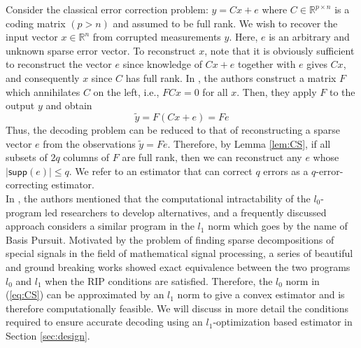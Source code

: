 \documentclass[../../thesis.tex]{subfiles}
\newcommand{\norm}[1]{\left\lVert#1\right\rVert}
\begin{document}
%
Consider the classical error correction problem: $y=Cx + e$ where $C\in \mathbb{R}^{p\times n}$ is a coding matrix $(p > n)$ and assumed to be full rank. We wish to recover the input vector $x \in \mathbb{R}^n$ from corrupted measurements $y$. Here, $e$ is an arbitrary and unknown sparse error vector. To reconstruct $x$, note that it is obviously sufficient to reconstruct the vector $e$ since knowledge of $Cx + e$ together with $e$ gives $Cx$, and consequently $x$ since $C$ has full rank. In \cite{Candes_Tao}, the authors construct a matrix $F$ which annihilates $C$ on the left, i.e.,  $FCx = 0$ for all $x$. Then, they apply $F$ to the output $y$ and obtain
\begin{equation}
	\tilde y = F (Cx + e) = Fe 
\end{equation}
Thus, the decoding problem can be reduced to that of reconstructing a sparse vector $e$ from the observations $\tilde y = Fe$. Therefore, by Lemma \ref{lem:CS}, if all subsets of $2q$ columns of $F$ are full rank, then we can reconstruct any $e$ whose  $\lvert \textsf{supp}(e) \rvert \le q$. We refer to an estimator that can correct $q$ errors as a $q$-error-correcting estimator.\\
In \cite{Candes_Tao}, the authors mentioned that the computational intractability of the $l_0$-program led researchers to develop alternatives, and a frequently discussed approach considers a similar program in the $l_1$ norm which goes by the name of Basis Pursuit. Motivated by the problem of finding sparse decompositions of special signals in the field of mathematical signal processing, a series of beautiful and ground breaking works \cite{Donoho2003, Elad2002, Gribonval2003, Tropp2004} showed exact equivalence between the two programs $l_0$ and $l_1$ when the RIP conditions are satisfied. Therefore, the $l_0$ norm in (\ref{eq:CS}) can be approximated by an $l_1$ norm to give a convex estimator and is therefore computationally feasible. 
We will discuss in more detail the conditions required to ensure accurate decoding using an $l_1$-optimization based estimator in Section \ref{sec:design}. 
\end{document}
